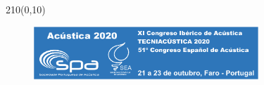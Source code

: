 \pagestyle{plain}
\thispagestyle{firststyle}
\begin{textblock}{210}(0,10)
\begin{figure}
\centering \includegraphics[height=2cm,page=1]{ac2020.pdf}
\end{figure}
\end{textblock}

